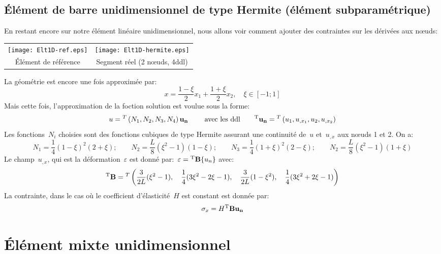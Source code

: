   \subsection{Élément de barre unidimensionnel de type Hermite (élément subparamétrique)}
\fi
En restant encore sur notre élément linéaire unidimensionnel, nous allons voir comment ajouter des
contraintes sur les dérivées aux nœuds:
\begin{table}[ht]\centering
\begin{tabular}{cc}
\texttt{[image: Elt1D-ref.eps]} &
\texttt{[image: Elt1D-hermite.eps]} \\
Élément de référence & Segment réel (2 nœuds, 4ddl)
\end{tabular}
\end{table}
\medskipvm
La géométrie est encore une fois approximée par:
\begin{equation} x=\frac{1-\xi}2 x_1 + \frac{1+\xi}2 x_2, \quad \xi\in[-1;1] \end{equation}
\medskipvm
Mais cette fois, l'approximation de la foction solution est voulue sous la forme:
\begin{equation}
u = \LLL{N_1, N_2, N_3, N_4}\VV{u_n} \qquad \text{ avec les ddl} \qquad
\LL{u_n}=\LLL{u_1, u_{,x_1}, u_2, u_{,x_2}} 
\end{equation}
\medskipvm
Les fonctions~$N_i$ choisies sont des fonctions cubiques de type Hermite assurant une continuité
de~$u$ et~$u_{,x}$ aux nœuds 1 et 2. On a:
\begin{equation}
N_1=\frac14(1-\xi)^2(2+\xi); \qquad
N_2=\frac{L}8(\xi^2-1)(1-\xi); \qquad
N_3=\frac14(1+\xi)^2(2-\xi); \qquad
N_2=\frac{L}8(\xi^2-1)(1+\xi)
\end{equation}
\medskipvm
Le champ~$u_{,x}$, qui est la déformation~$\varepsilon$ est donné par:~$\varepsilon={}^\mathrm{T}\mathbf{B}\{u_n\}$ avec:
\begin{equation} {}^\mathrm{T}\mathbf{B}={}^T\left( \frac3{2L}(\xi^2-1), \quad \frac14(3\xi^2-2\xi-1), \quad \frac3{2L}(1-\xi^2), \quad
\frac14(3\xi^2+2\xi-1)\right)\end{equation}
\medskipvm
La contrainte, dans le cas où le coefficient d'élasticité~$H$ est constant est
donnée par:
\begin{equation}\sigma_x=H \LL{B}\VV{u_n}\end{equation}
\medskipvm
\ifVersionAvecExemplesSepares
  \section{Élément mixte unidimensionnel}
\else

